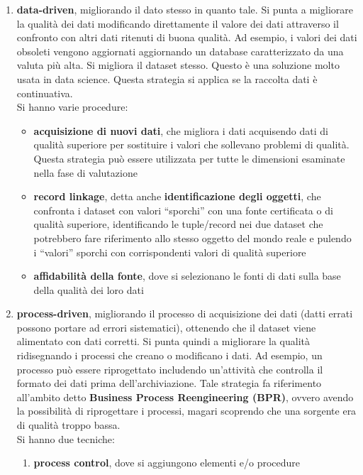 \documentclass[a4paper,12pt, oneside]{book}
\begin{document}
\begin{enumerate}
  \item \textbf{data-driven}, migliorando il dato stesso in quanto tale. Si
  punta a migliorare la qualità dei dati modificando direttamente il valore dei
  dati attraverso il confronto con altri dati ritenuti di buona qualità. Ad
  esempio, i valori dei dati obsoleti vengono aggiornati aggiornando un database
  caratterizzato da una valuta più alta. Si migliora il dataset stesso. Questo è
  una soluzione molto usata in data science. Questa strategia si applica se la
  raccolta dati è continuativa.\\
  Si hanno varie procedure:
  \begin{itemize}
    \item \textbf{acquisizione di nuovi dati}, che migliora i dati acquisendo
    dati di qualità superiore per sostituire i valori che sollevano problemi di
    qualità. Questa strategia può essere utilizzata per tutte le dimensioni
    esaminate nella fase di valutazione 
    \item \textbf{record linkage}, detta anche \textbf{identificazione degli
      oggetti}, che confronta i dataset con valori ``sporchi'' con una fonte
    certificata o di qualità superiore, identificando le tuple/record nei due
    dataset che potrebbero fare riferimento allo stesso oggetto del mondo
    reale e pulendo i ``valori'' sporchi con corrispondenti valori di qualità
    superiore
    \item \textbf{affidabilità della fonte}, dove si selezionano le fonti di
    dati sulla base della qualità dei loro dati 
  \end{itemize}
  \item \textbf{process-driven}, migliorando il processo di acquisizione dei
  dati (datti errati possono portare ad errori sistematici), ottenendo che il
  dataset viene alimentato con dati corretti. Si punta 
  quindi a migliorare la qualità ridisegnando i processi che creano o modificano
  i dati. Ad esempio, un processo può essere riprogettato includendo un'attività
  che controlla il formato dei dati prima dell'archiviazione. Tale strategia fa
  riferimento all'ambito detto \textbf{Business Process Reengineering (BPR)},
  ovvero avendo la possibilità di riprogettare i processi, magari scoprendo che
  una sorgente era di qualità troppo bassa.\\
  Si hanno due tecniche:
  \begin{enumerate}
    \item \textbf{process control}, dove si aggiungono elementi e/o procedure

\end{enumerate}
\end{enumerate}
\end{document}
